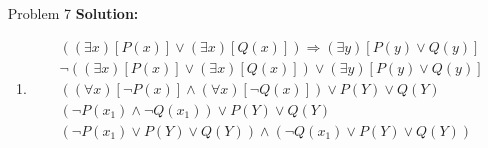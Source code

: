 \normalfont\documentclass[letterpaper,11pt]{article}
\begin{document}
\begin{enumerate}
\item[Problem 7]\textbf{Solution:}\par
\begin{enumerate}
	\item 
	\begin{eqnarray*}
		&&((\exists x)[P(x)] \lor (\exists x)[Q(x)])\Rightarrow (\exists y)[P(y) \lor Q(y)]\\
		&&\neg ((\exists x)[P(x)] \lor (\exists x)[Q(x)]) \lor (\exists y)[P(y) \lor Q(y)]\\
		&&((\forall x)[\neg P(x)] \land (\forall x)[\neg Q(x)]) \lor P(Y) \lor Q(Y)\\
		&&(\neg P(x_1)\land \neg Q(x_1)) \lor P(Y) \lor Q(Y)\\
		&&(\neg P(x_1)\lor P(Y) \lor Q(Y)) \land (\neg Q(x_1) \lor P(Y) \lor Q(Y))
	\end{eqnarray*}


\end{enumerate}
\end{enumerate}
\end{document}
